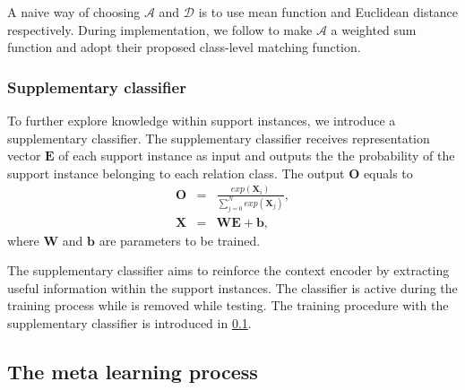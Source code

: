 
A naive way of choosing $\mathcal{A}$ and $\mathcal{D}$ is to use mean function and Euclidean distance \citep{proto} respectively. During implementation, we follow \citet{ye-ling-2019-multi} to make $\mathcal{A}$ a weighted sum function and adopt their proposed class-level matching function.

\subsubsection{Supplementary classifier}
To further explore knowledge within support instances, we introduce a supplementary classifier. The supplementary classifier receives representation vector $\mathbf{E}$ of each support instance as input and outputs the the probability of the support instance belonging to each relation class. %
The output $\mathbf{O}$ equals to
\begin{eqnarray}
\mathbf{O} &=& \frac{exp(\mathbf{X}_i)}{\sum_{j=0}^{N} exp(\mathbf{X}_j)}, \\
\mathbf{X} &=& \mathbf{WE}+ \mathbf{b},
\end{eqnarray}
where $\mathbf{W}$ and $\mathbf{b}$ are parameters to be trained.

The supplementary classifier aims to reinforce the context encoder by extracting useful information within the support instances. The classifier is active during the training process while is removed while testing. The training procedure with the supplementary classifier is introduced in \ref{sec:process}.

\subsection{The meta learning process}
\label{sec:process}

